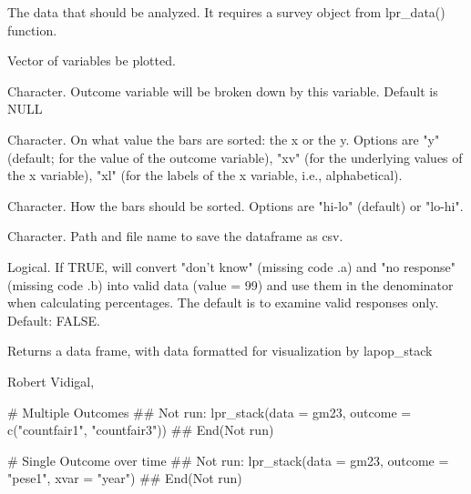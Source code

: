 \documentclass[a4paper]{book}
\begin{document}
\begin{Arguments}
\begin{ldescription}
\item[\code{data}] The data that should be analyzed. It requires a survey object from lpr\_data() function.

\item[\code{outcome}] Vector of variables be plotted.

\item[\code{xvar}] Character. Outcome variable will be broken down by this variable. Default is NULL

\item[\code{sort}] Character. On what value the bars are sorted: the x or the y.
Options are "y" (default; for the value of the outcome variable), "xv" (for
the underlying values of the x variable), "xl" (for the labels of the x variable,
i.e., alphabetical).

\item[\code{order}] Character. How the bars should be sorted. Options are "hi-lo"
(default) or "lo-hi".

\item[\code{filesave}] Character. Path and file name to save the dataframe as csv.

\item[\code{keep\_nr}] Logical. If TRUE, will convert "don't know" (missing code .a)
and "no response" (missing code .b) into valid data (value = 99) and use them
in the denominator when calculating percentages.  The default is to examine
valid responses only.  Default: FALSE.
\end{ldescription}
\end{Arguments}
%
\begin{Value}
Returns a data frame, with data formatted for visualization by lapop\_stack
\end{Value}
%
\begin{Author}
Robert Vidigal, 
\end{Author}
%
\begin{Examples}
\begin{ExampleCode}
# Multiple Outcomes
## Not run: 
lpr_stack(data = gm23, outcome = c("countfair1", "countfair3"))
## End(Not run)

# Single Outcome over time
## Not run: 
lpr_stack(data = gm23, outcome = "pese1", xvar = "year")
## End(Not run)
\end{ExampleCode}
\end{Examples}
\end{document}
